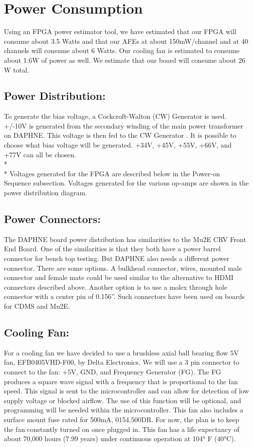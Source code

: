 \section{Power Consumption}
\label{sec:interfaces}

Using an FPGA power estimator tool, we have estimated that our FPGA will consume about 3.5 Watts and that our AFEs at about 150mW/channel and at 40 channels will consume about 6 Watts. Our cooling fan is estimated to consume about 1.6W of power as well. We estimate that our board will consume about 26 W total. 

\subsection{Power Distribution: }

To generate the bias voltage, a Cockcroft-Walton (CW) Generator is used. +/-10V is generated from the secondary winding of the main power transformer on DAPHNE. This voltage is then fed to the CW Generator . It is possible to choose what bias voltage will be generated. +34V, +45V, +55V, +66V, and +77V can all be chosen.
\\*
\\* Voltages generated for the FPGA are described below in the Power-on Sequence subsection. Voltages generated for the various op-amps are shown in the power distribution diagram. 

\subsection{Power Connectors: }

The DAPHNE board power distribution has similarities to the Mu2E CRV Front End Board. One of the similarities is that they both have a power barrel connector for bench top testing. 
But DAPHNE also needs a different power connector. There are some options. A bulkhead connector, wires, mounted male connector and female mate could be used similar to the alternative to HDMI connectors described above. 
Another option is to use a molex through hole connector with a center pin of 0.156”. Such connectors have been used on boards for CDMS and Mu2E.

\subsection{Cooling Fan: }

For a cooling fan we have decided to use a brushless axial ball bearing flow 5V fan, EFB0405VHD-F00, by Delta Electronics.  We will use a 3 pin connector to connect to the fan: +5V, GND, and Frequency Generator (FG). The FG produces a square wave signal with a frequency that is proportional to the fan speed. This signal is sent to the microcontroller and can allow for detection of low supply voltage or blocked airflow. The use of this function will be optional, and programming will be needed within the microcontroller. 
This fan also includes a surface mount fuse rated for 500mA, 0154.500DR. For now, the plan is to keep the fan constantly turned on once plugged in. This fan has a life expectancy of about 70,000 hours (7.99 years) under continuous operation at 104° F (40°C). 



